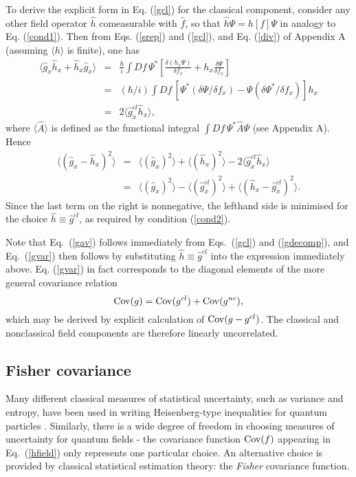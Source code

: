 \documentclass[a4paper,preprint, showpacs, aps, draft]{revtex4}
\begin{document}
{To derive the explicit form in Eq. (\ref{gcl}) for the classical
component, consider any other field operator $\hat{h}$ comeasurable
with $\hat{f}$, so that $\hat{h}\Psi = h[f]\Psi$ in analogy to Eq.
(\ref{cond1}).  Then from Eqs. (\ref{srep}) and (\ref{gcl}), and Eq.
(\ref{div}) of Appendix A (assuming $\langle h\rangle$ is finite), one has
\begin{eqnarray*}
\langle \hat{g}_x\hat{h}_x + \hat{h}_x\hat{g}_x\rangle & =
&\frac{\hbar}{i}\int D\! f\, \Psi^*\left[\frac{\delta (h_x\Psi)}{\delta
f_x} + h_x\frac{\delta\Psi}{\delta f_x}\right]\\
& = & (\hbar/i)\int D\! f\, [\Psi^*(\delta\Psi/\delta f_x) - \Psi
(\delta\Psi^* /\delta f_x)]h_x\\
& = & 2\langle \hat{g}^{cl}_x \hat{h}_x\rangle ,
\end{eqnarray*}
where $\langle\hat{A}\rangle$ is defined as the functional integral
$\int D\! f\, \Psi^*\hat{A}\Psi$ (see Appendix A).  Hence
\begin{eqnarray*}
\langle (\hat{g}_x-\hat{h}_x)^2\rangle & = & \langle
(\hat{g}_x)^2\rangle + \langle(\hat{h}_x)^2\rangle
-2\langle\hat{g}^{cl}_x\hat{h}_x\rangle\\
& = & \langle(\hat{g}_x)^2\rangle - \langle(\hat{g}^{cl}_x)^2
\rangle + \langle (\hat{h}_x - \hat{g}^{cl}_x)^2\rangle .
\end{eqnarray*}
Since the last term on the right is nonnegative, the lefthand side is
minimised for the choice $\hat{h}\equiv\hat{g}^{cl}$, as required by
condition (\ref{cond2}).  

Note that Eq.~(\ref{gav}) follows immediately
from Eqs.~(\ref{gcl}) and (\ref{gdecomp}), and Eq.~(\ref{gvar}) then
follows by substituting $\hat{h}\equiv\hat{g}^{cl}$ into the expression 
immediately above.  Eq. (\ref{gvar}) in fact corresponds to the diagonal
elements of the more general covariance relation
\begin{equation} \label{covadd}
{\rm Cov}(g) = {\rm Cov}(g^{cl}) + {\rm Cov}(g^{nc}) ,
\end{equation}
which may be derived by explicit calculation of ${\rm Cov}(g-g^{cl})$.  The
classical and nonclassical field components are therefore linearly uncorrelated. 

\subsection{Fisher covariance}
Many different classical measures of statistical
uncertainty, such as variance and entropy, have been used in writing
Heisenberg-type inequalities for quantum particles \cite{uffink}. 
Similarly, there is a wide degree of freedom in choosing measures of
uncertainty for quantum fields - the covariance function ${\rm
Cov}(f)$ appearing in Eq.~(\ref{hfield}) only represents one particular choice.
An alternative choice is provided by classical statistical
estimation theory:  the {\it Fisher} covariance function.

}
\end{document}
